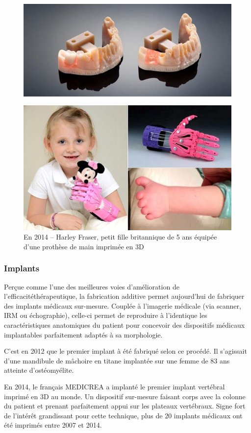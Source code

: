 \documentclass{article}
\begin{document}
\begin{figure}[h!]
\centering
\includegraphics[scale=0.4]{./images/prothesedentaire.png}
\end{figure}

\begin{figure}[h!]
\centering
\includegraphics[scale=0.4]{./images/HarleyFraser.png}
\caption{En 2014 – Harley Fraser, petit fille britannique de 5 ans équipée d'une prothèse de main imprimée en 3D}
\end{figure}
\newpage
\subsubsection{Implants}
Perçue comme l'une des meilleures voies d'amélioration de l'efficacité\hfill \break thérapeutique, la fabrication additive permet aujourd'hui de fabriquer des implants médicaux sur-mesure. Couplée à l'imagerie médicale (via scanner, IRM ou échographie), celle-ci permet de reproduire à l'identique les caractéristiques anatomiques du patient pour concevoir des dispositifs médicaux implantables parfaitement adaptés à sa morphologie.\hfill
 \par\leavevmode\par
C'est en 2012 que le premier implant à été fabriqué selon ce procédé. Il s'agissait d'une mandibule de mâchoire en titane implantée sur une femme de 83 ans atteinte d'ostéomyélite.\hfill
 \par\leavevmode\par
En 2014, le français MEDICREA a implanté le premier implant vertébral imprimé en 3D au monde. Un
dispositif sur-mesure faisant corps avec la colonne du patient et prenant parfaitement appui sur les plateaux vertébraux. Signe fort de l'intérêt grandissant pour cette technique, plus de 20 implants médicaux ont été imprimés entre 2007 et 2014.
\end{document}
